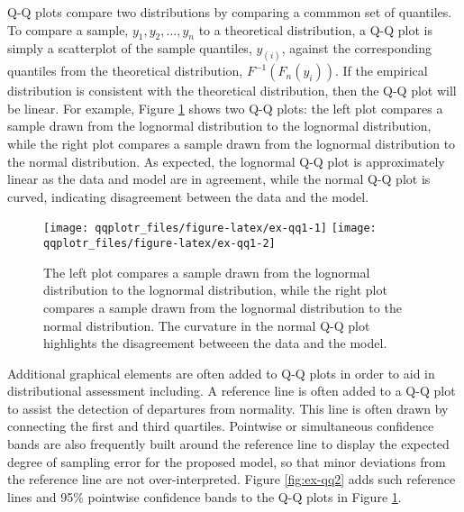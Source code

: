 Q-Q plots compare two distributions by comparing a commmon set of
quantiles. To compare a sample, \(y_1, y_2, \ldots, y_n\) to a
theoretical distribution, a Q-Q plot is simply a scatterplot of the
sample quantiles, \(y_{(i)}\), against the corresponding quantiles from
the theoretical distribution, \(F^{-1}\left( F_n(y_i) \right)\). If the
empirical distribution is consistent with the theoretical distribution,
then the Q-Q plot will be linear. For example, Figure \ref{fig:ex-qq1}
shows two Q-Q plots: the left plot compares a sample drawn from the
lognormal distribution to the lognormal distribution, while the right
plot compares a sample drawn from the lognormal distribution to the
normal distribution. As expected, the lognormal Q-Q plot is
approximately linear as the data and model are in agreement, while the
normal Q-Q plot is curved, indicating disagreement between the data and
the model.

\begin{Schunk}
\begin{figure}

{\centering \texttt{[image: qqplotr\_files/figure-latex/ex-qq1-1]} \texttt{[image: qqplotr\_files/figure-latex/ex-qq1-2]} 

}

\caption[The left plot compares a sample drawn from the lognormal distribution to the lognormal distribution, while the right plot compares a sample drawn from the lognormal distribution to the normal distribution]{The left plot compares a sample drawn from the lognormal distribution to the lognormal distribution, while the right plot compares a sample drawn from the lognormal distribution to the normal distribution. The curvature in the normal Q-Q plot highlights the disagreement betweeen the data and the model.}\label{fig:ex-qq1}
\end{figure}
\end{Schunk}

Additional graphical elements are often added to Q-Q plots in order to
aid in distributional assessment including. A reference line is often
added to a Q-Q plot to assist the detection of departures from
normality. This line is often drawn by connecting the first and third
quartiles. Pointwise or simultaneous confidence bands are also
frequently built around the reference line to display the expected
degree of sampling error for the proposed model, so that minor
deviations from the reference line are not over-interpreted. Figure
\ref{fig:ex-qq2} adds such reference lines and 95\% pointwise confidence
bands to the Q-Q plots in Figure \ref{fig:ex-qq1}.

